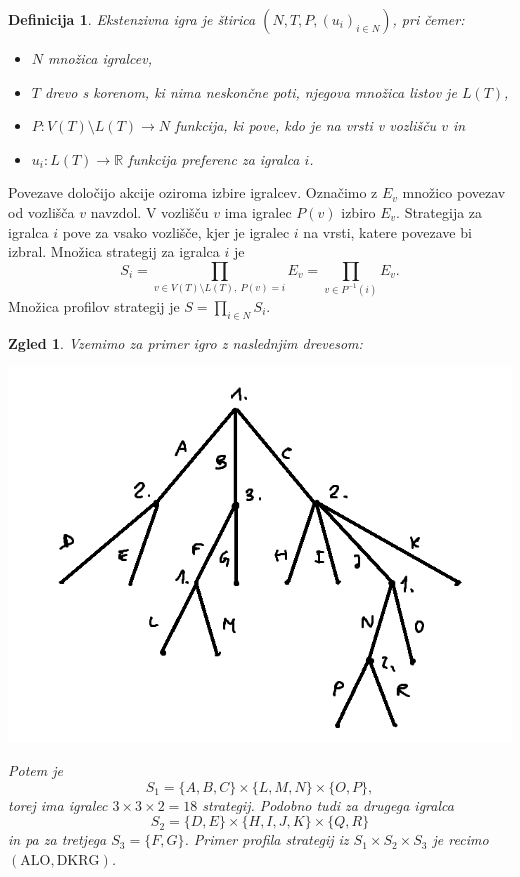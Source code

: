 \documentclass[10pt, a4paper]{article}
\newtheorem{defi}[izr]{Definicija}
\newenvironment{noticeB}{%
  \tcolorbox[%
  notitle,
  empty,
  enhanced,  %
  breakable,
  coltext=black,
  colback=white, 
  fontupper=\rmfamily,
  noparskip,
  sharp corners,
  boxrule=-1pt,  %
  frame hidden,
  left=7pt,  %
  right=7pt,
  top=5pt,
  bottom=5pt,
  before skip=2.5ex plus 2pt,
  after skip=2.5ex plus 2pt,
  borderline west = {1.5pt}{-0.1pt}{blue!30!black}, %
  overlay unbroken and last={%
    \draw[color=black, line width=1.25pt]
    ($(frame.south west)+(1.pt, -0.1pt)$) -- ++(2em, 0);
  }
  ]}
{\endtcolorbox}
\newenvironment{definicija}{\begin{noticeB}\begin{defi}}{%
    \end{defi}\end{noticeB}}
\newtheorem{zgled}[izr]{Zgled}
\newcommand{\R}{\mathbb {R}}
\begin{document}
\begin{definicija}
  Ekstenzivna igra je štirica $(N, T, P, (u_i)_{i \in N})$, pri čemer:
  \begin{itemize}
    \item $N$ množica igralcev,
    \item $T$ drevo s korenom, ki nima neskončne poti, njegova množica listov je $L(T)$,
    \item $P: V(T) \setminus L(T) \to N$ funkcija, ki pove, kdo je na vrsti v vozlišču $v$ in 
    \item $u_i: L(T) \to \R$ funkcija preferenc za igralca $i$.
  \end{itemize}
\end{definicija}

Povezave določijo akcije oziroma izbire igralcev. Označimo z $E_v$ množico povezav od vozlišča $v$ navzdol.
V vozlišču $v$ ima igralec $P(v)$ izbiro $E_v$. Strategija za igralca $i$ pove za vsako vozlišče, kjer je igralec $i$ na vrsti,
katere povezave bi izbral. Množica strategij za igralca $i$ je 
$$S_i = \prod_{v \in V(T) \setminus L(T),\ P(v) = i} E_v = \prod_{v \in P^{-1} (i)} E_v.$$
Množica profilov strategij je $S = \prod_{i \in N} S_i$.

\begin{zgled}
  Vzemimo za primer igro z naslednjim drevesom:
  \begin{center}
    \includegraphics[scale=0.6]{drevo_3.png}
  \end{center}
  Potem je 
  $$S_1 = \{A, B, C\} \times \{L, M, N\} \times \{O, P\},$$
  torej ima igralec $3 \times 3 \times 2 = 18$ strategij. Podobno tudi za drugega igralca
  $$S_2 = \{D, E\} \times \{H, I, J, K\} \times \{Q, R\}$$ in pa za tretjega $S_3 = \{F, G\}$.
  Primer profila strategij iz $S_1 \times S_2 \times S_3$ je recimo $(\text{ALO}, \text{DKRG})$.
\end{zgled}
\end{document}
